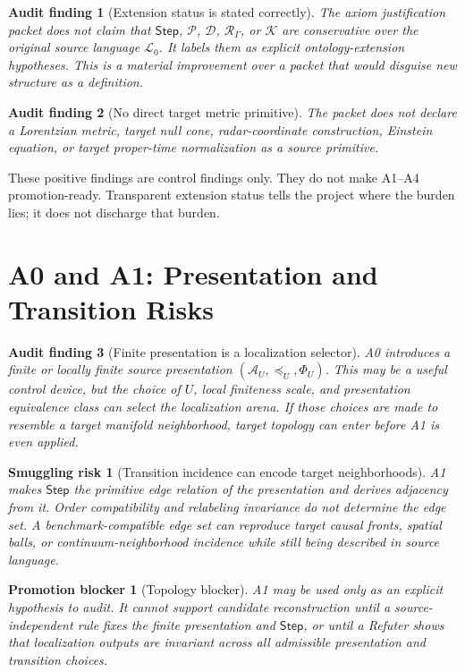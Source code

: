 \documentclass[11pt]{article}
\newcommand{\Sub}{\mathcal{A}}
\newcommand{\Step}{\mathsf{Step}}
\newcommand{\RespAlg}{\mathcal{R}_{\Gamma}}
\newcommand{\Lang}{\mathcal{L}_{0}}
\newtheorem{auditfinding}{Audit finding}
\newtheorem{smugglingrisk}{Smuggling risk}
\newtheorem{promotionblocker}{Promotion blocker}
\begin{document}
\begin{auditfinding}[Extension status is stated correctly]
The axiom justification packet does not claim that \(\Step\),
\(\mathcal{P}\), \(\mathcal{D}\), \(\RespAlg\), or \(\mathcal{K}\) are
conservative over the original source language \(\Lang\). It labels them as
explicit ontology-extension hypotheses. This is a material improvement over a
packet that would disguise new structure as a definition.
\end{auditfinding}

\begin{auditfinding}[No direct target metric primitive]
The packet does not declare a Lorentzian metric, target null cone,
radar-coordinate construction, Einstein equation, or target proper-time
normalization as a source primitive.
\end{auditfinding}

These positive findings are control findings only. They do not make A1--A4
promotion-ready. Transparent extension status tells the project where the
burden lies; it does not discharge that burden.

\section{A0 and A1: Presentation and Transition Risks}

\begin{auditfinding}[Finite presentation is a localization selector]
A0 introduces a finite or locally finite source presentation
\((\Sub_U,\preceq_U,\Phi_U)\). This may be a useful control device, but the
choice of \(U\), local finiteness scale, and presentation equivalence class can
select the localization arena. If those choices are made to resemble a target
manifold neighborhood, target topology can enter before A1 is even applied.
\end{auditfinding}

\begin{smugglingrisk}[Transition incidence can encode target neighborhoods]
A1 makes \(\Step\) the primitive edge relation of the presentation and derives
adjacency from it. Order compatibility and relabeling invariance do not
determine the edge set. A benchmark-compatible edge set can reproduce target
causal fronts, spatial balls, or continuum-neighborhood incidence while still
being described in source language.
\end{smugglingrisk}

\begin{promotionblocker}[Topology blocker]
A1 may be used only as an explicit hypothesis to audit. It cannot support
candidate reconstruction until a source-independent rule fixes the finite
presentation and \(\Step\), or until a Refuter shows that localization outputs
are invariant across all admissible presentation and transition choices.
\end{promotionblocker}
\end{document}
